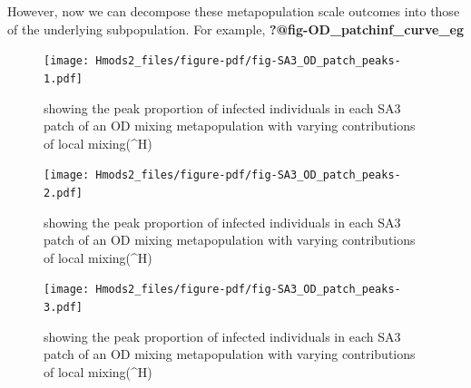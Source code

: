 \documentclass[
  letterpaper,
  DIV=11,
  numbers=noendperiod]{scrartcl}
\begin{document}
However, now we can decompose these metapopulation scale outcomes into
those of the underlying subpopulation. For example,
\textbf{?@fig-OD\_patchinf\_curve\_eg}

\begin{figure}

{\centering \texttt{[image: Hmods2\_files/figure-pdf/fig-SA3\_OD\_patch\_peaks-1.pdf]}

}

\caption{\label{fig-SA3_OD_patch_peaks-1}showing the peak proportion of
infected individuals in each SA3 patch of an OD mixing metapopulation
with varying contributions of local mixing(\delta\^{}H)}

\end{figure}

\begin{figure}

{\centering \texttt{[image: Hmods2\_files/figure-pdf/fig-SA3\_OD\_patch\_peaks-2.pdf]}

}

\caption{\label{fig-SA3_OD_patch_peaks-2}showing the peak proportion of
infected individuals in each SA3 patch of an OD mixing metapopulation
with varying contributions of local mixing(\delta\^{}H)}

\end{figure}

\begin{figure}

{\centering \texttt{[image: Hmods2\_files/figure-pdf/fig-SA3\_OD\_patch\_peaks-3.pdf]}

}

\caption{\label{fig-SA3_OD_patch_peaks-3}showing the peak proportion of
infected individuals in each SA3 patch of an OD mixing metapopulation
with varying contributions of local mixing(\delta\^{}H)}

\end{figure}
\end{document}
